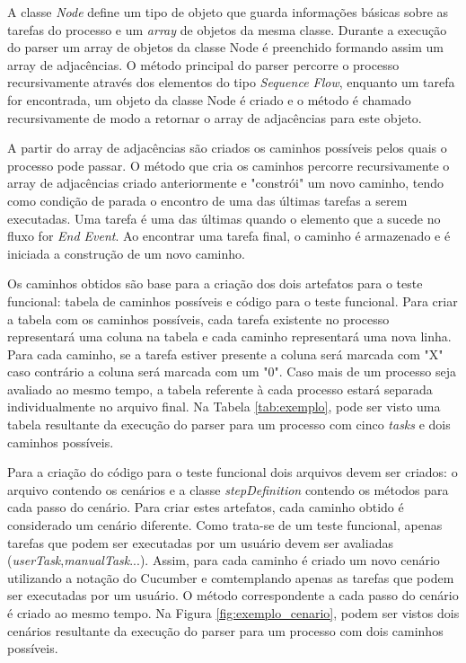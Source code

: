 \documentclass[12pt]{article}
\begin{document}
A classe \emph{Node} define um tipo de objeto que guarda informações básicas sobre as tarefas do processo e um \emph{array} de objetos da mesma classe. Durante a execução do parser um array de objetos da classe Node é preenchido formando assim um array de adjacências. O método principal do parser percorre o processo recursivamente através dos elementos do tipo \emph{Sequence Flow}, enquanto um tarefa for encontrada, um objeto da classe Node é criado e o método é chamado recursivamente de modo a retornar o array de adjacências para este objeto.

A partir do array de adjacências são criados os caminhos possíveis pelos quais o processo pode passar. O método que cria os caminhos percorre recursivamente o array de adjacências criado anteriormente e "constrói" um novo caminho, tendo como condição de parada o encontro de uma das últimas tarefas a serem executadas. Uma tarefa é uma das últimas quando o elemento que a sucede no fluxo for \emph{End Event}. Ao encontrar uma tarefa final, o caminho é armazenado e é iniciada a construção de um novo caminho.

Os caminhos obtidos são base para a criação dos dois artefatos para o teste funcional: tabela de caminhos possíveis e código para o teste funcional. Para criar a tabela com os caminhos possíveis, cada tarefa existente no processo representará uma coluna na tabela e cada caminho representará uma nova linha. Para cada caminho, se a tarefa estiver presente a coluna será marcada com "X" caso contrário a coluna será marcada com um "0". Caso mais de um processo seja avaliado ao mesmo tempo, a tabela referente à cada processo estará separada individualmente no arquivo final. Na Tabela \ref{tab:exemplo}, pode ser visto uma tabela resultante da execução do parser para um processo com cinco \emph{tasks} e dois caminhos possíveis. 

Para a criação do código para o teste funcional dois arquivos devem ser criados: o arquivo contendo os cenários e a classe \emph{stepDefinition} contendo os métodos para cada passo do cenário. Para criar estes artefatos, cada caminho obtido é considerado um cenário diferente. Como trata-se de um teste funcional, apenas tarefas que podem ser executadas por um usuário devem ser avaliadas (\emph{userTask},\emph{manualTask}...). Assim, para cada caminho é criado um novo cenário utilizando a notação do Cucumber e comtemplando apenas as tarefas que podem ser executadas por um usuário. O método correspondente a cada passo do cenário é criado ao mesmo tempo. Na Figura \ref{fig:exemplo_cenario}, podem ser vistos dois cenários resultante da execução do parser para um processo com dois caminhos possíveis. 
\end{document}
